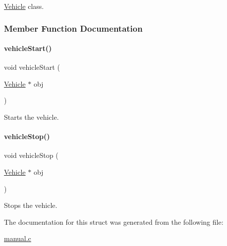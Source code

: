 \hyperlink{struct_vehicle}{Vehicle} class. 

\subsubsection{Member Function Documentation}
\mbox{\label{struct_vehicle_a6891d3d28853bc3fdd075596dc6de9f8}} 
\paragraph{\texorpdfstring{vehicle\+Start()}{vehicleStart()}}
{\footnotesize\ttfamily void vehicle\+Start (\begin{DoxyParamCaption}\item[{\hyperlink{struct_vehicle}{Vehicle} $\ast$}]{obj }\end{DoxyParamCaption})}

Starts the vehicle. \mbox{\label{struct_vehicle_a4dcbcba43792dcd673a552b14479ab77}} 
\paragraph{\texorpdfstring{vehicle\+Stop()}{vehicleStop()}}
{\footnotesize\ttfamily void vehicle\+Stop (\begin{DoxyParamCaption}\item[{\hyperlink{struct_vehicle}{Vehicle} $\ast$}]{obj }\end{DoxyParamCaption})}

Stops the vehicle. 

The documentation for this struct was generated from the following file\+:\begin{DoxyCompactItemize}
\item 
\hyperlink{manual_8c}{manual.\+c}\end{DoxyCompactItemize}
